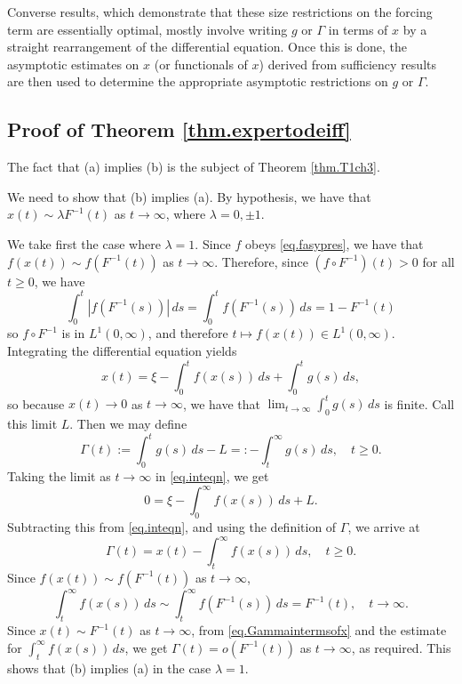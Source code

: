 \documentclass[a4paper,10pt,reqno]{amsart}
\numberwithin{equation}{section}
\theoremstyle{definition}
\theoremstyle{remark}
\DeclareMathOperator{\1}{\mathbbm 1}
\begin{document}
	Converse results, which demonstrate that these size restrictions on the forcing term are essentially optimal, mostly involve writing $g$ or $\Gamma$ in terms of $x$ by a straight rearrangement of the differential equation. Once this is done, the asymptotic estimates on $x$ (or functionals of $x$) derived from sufficiency results are then used to determine the appropriate asymptotic restrictions on $g$ or $\Gamma$.  
	
	\subsection{Proof of Theorem \ref{thm.expertodeiff}}
	The fact that (a) implies (b) is the subject of Theorem \ref{thm.T1ch3}. 
	
	We need to show that (b) implies (a). By hypothesis, we have that 
	$x(t)\sim \lambda F^{-1}(t)$ as $t\to\infty$, where $\lambda=0,\pm 1$. 
	
	We take first the case where $\lambda=1$. Since $f$ obeys \eqref{eq.fasypres}, we have that $f(x(t))\sim f(F^{-1}(t))$ as $t\to\infty$. Therefore, since $(f\circ F^{-1})(t)>0$ for all $t\geq 0$, we have  
	\[
	\int_0^t |f(F^{-1}(s))|\,ds = \int_0^t f(F^{-1}(s))\,ds= 1-F^{-1}(t)
	\] 
	so $f\circ F^{-1}$ is in $L^1(0,\infty)$, and therefore $t\mapsto f(x(t))\in L^1(0,\infty)$. Integrating the differential equation yields
	\begin{equation} \label{eq.inteqn}
		x(t)=\xi-\int_0^t f(x(s))\,ds + \int_0^t g(s)\,ds, 
	\end{equation}
	so because $x(t)\to 0$ as $t\to\infty$, we have that $\lim_{t\to\infty} \int_0^t g(s)\,ds$ is finite. Call this limit $L$. Then we may define 
	\[
	\Gamma(t):=\int_0^t g(s)\,ds - L =: -\int_t^\infty g(s)\,ds, \quad t\geq 0.
	\]
	Taking the limit as $t\to\infty$ in \eqref{eq.inteqn}, we get 
	\begin{equation*} 
		0=\xi-\int_0^\infty f(x(s))\,ds + L. 
	\end{equation*}
	Subtracting this from \eqref{eq.inteqn}, and using the definition of $\Gamma$, we arrive at 
	\begin{equation} \label{eq.Gammaintermsofx}
		\Gamma(t)=x(t)-\int_t^\infty f(x(s))\,ds, \quad t\geq 0.
	\end{equation}
	Since $f(x(t))\sim f(F^{-1}(t))$ as $t\to\infty$,
	\[
	\int_t^\infty f(x(s))\,ds \sim \int_t^\infty f(F^{-1}(s))\,ds = F^{-1}(t), \quad t\to\infty.
	\] 
	Since $x(t)\sim F^{-1}(t)$ as $t\to\infty$, from \eqref{eq.Gammaintermsofx} and the estimate for $\int_t^\infty f(x(s))\,ds$, we get $\Gamma(t)=o(F^{-1}(t))$ as $t\to\infty$, as required. This shows that (b) implies (a) in the case $\lambda=1$.
	
\end{document}
